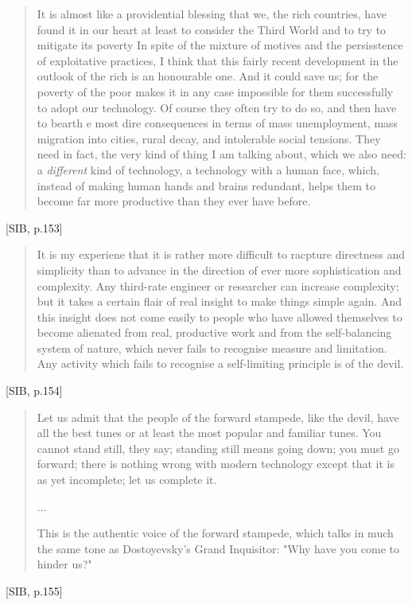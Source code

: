 \documentclass[letterpaper]{article}
\begin{document}
\begin{quote}
  It is almost like a providential blessing that we, the rich countries, have found it in our heart at least to consider the Third World and to try to mitigate its poverty In spite of the mixture of motives and the persisstence of exploitative practices, I think that this fairly recent development in the outlook of the rich is an honourable one. And it could save us; for the poverty of the poor makes it in any case impossible for them successfully to adopt our technology. Of course they often try to do so, and then have to bearth e most dire consequences in terms of mass unemployment, mass migration into cities, rural decay, and intolerable social tensions. They need in fact, the very kind of thing I am talking about, which we also need: a \textit{different} kind of technology, a technology with a human face, which, instead of making human hands and brains redundant, helps them to become far more productive than they ever have before.
\end{quote}[SIB, p.153]

\begin{quote}
  It is my experiene that it is rather more difficult to racpture directness and simplicity than to advance in the direction of ever more sophistication and complexity. Any third-rate engineer or researcher can increase complexity; but it takes a certain flair of real insight to make things simple again. And this insight does not come easily to people who have allowed themselves to become alienated from real, productive work and from the self-balancing system of nature, which never fails to recognise measure and limitation. Any activity which fails to recognise a self-limiting principle is of the devil.
\end{quote}[SIB, p.154]

\begin{quote}
  Let us admit that the people of the forward stampede, like the devil, have all the best tunes or at least the most popular and familiar tunes. You cannot stand still, they say; standing still means going down; you must go forward; there is nothing wrong with modern technology except that it is as yet incomplete; let us complete it.

  ...

  This is the authentic voice of the forward stampede, which talks in much the same tone as Dostoyevsky's Grand Inquisitor: "Why  have you come to hinder us?"
\end{quote}[SIB, p.155]
\end{document}
